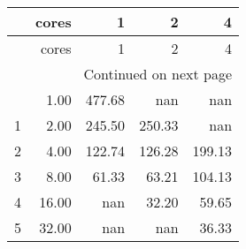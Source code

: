 \begin{longtable}{lrrrr}
	\timetable{5000}
\toprule
 & cores & 1 & 2 & 4 \\
\midrule
\endfirsthead
\toprule
 & cores & 1 & 2 & 4 \\
\midrule
\endhead
\midrule
\multicolumn{5}{r}{Continued on next page} \\
\midrule
\endfoot
\bottomrule
\endlastfoot
0 & 1.00 & 477.68 & nan & nan \\
1 & 2.00 & 245.50 & 250.33 & nan \\
2 & 4.00 & 122.74 & 126.28 & 199.13 \\
3 & 8.00 & 61.33 & 63.21 & 104.13 \\
4 & 16.00 & nan & 32.20 & 59.65 \\
5 & 32.00 & nan & nan & 36.33 \\
\end{longtable}

